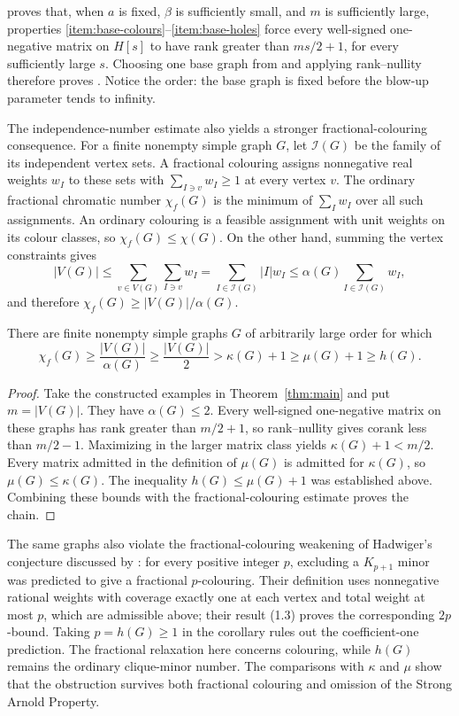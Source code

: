  proves that, when \(a\) is fixed,
\(\beta\) is sufficiently small, and \(m\) is sufficiently large,
properties \ref{item:base-colours}--\ref{item:base-holes} force every
well-signed one-negative matrix on \(H[s]\) to have rank greater than
\(ms/2+1\), for every sufficiently large \(s\).
Choosing one base graph from  and applying
rank--nullity therefore proves . Notice the order:
the base graph is fixed before the blow-up parameter tends to
infinity.

The independence-number estimate also yields a stronger
fractional-colouring consequence. For a finite nonempty simple graph
\(G\), let \(\mathcal I(G)\) be the family of its independent vertex
sets. A fractional colouring assigns nonnegative real weights \(w_I\)
to these sets with \(\sum_{I\ni v}w_I\ge1\) at every vertex \(v\).
The ordinary fractional chromatic number \(\chi_f(G)\) is the minimum
of \(\sum_Iw_I\) over all such assignments. An ordinary colouring is
a feasible assignment with unit weights on its colour classes, so
\(\chi_f(G)\le\chi(G)\). On the other hand, summing the vertex
constraints gives
\[
 |V(G)|\le \sum_{v\in V(G)}\sum_{I\ni v}w_I
 =\sum_{I\in\mathcal I(G)}|I|w_I
 \le \alpha(G)\sum_{I\in\mathcal I(G)}w_I,
\]
and therefore \(\chi_f(G)\ge |V(G)|/\alpha(G)\).

\begin{corollary}\label{cor:fractional-spectral}
There are finite nonempty simple graphs \(G\) of arbitrarily large
order for which
\[
 \chi_f(G)\ge \frac{|V(G)|}{\alpha(G)}
 \ge \frac{|V(G)|}{2}
 >\kappa(G)+1\ge\mu(G)+1\ge h(G).
\]
\end{corollary}
\begin{proof}
Take the constructed examples in Theorem~\ref{thm:main} and put
\(m=|V(G)|\). They have \(\alpha(G)\le2\). Every well-signed
one-negative matrix on these graphs has rank greater than \(m/2+1\),
so rank--nullity gives corank less than \(m/2-1\). Maximizing in the
larger matrix class yields \(\kappa(G)+1<m/2\).
Every matrix admitted in the definition of
\(\mu(G)\) is admitted for \(\kappa(G)\), so \(\mu(G)\le\kappa(G)\).
The inequality \(h(G)\le\mu(G)+1\) was established above. Combining
these bounds with the fractional-colouring estimate proves the chain.
\end{proof}

The same graphs also violate the fractional-colouring weakening
of Hadwiger's conjecture discussed by
\citet[p.~148]{reedseymour1998}: for every positive integer \(p\),
excluding a \(K_{p+1}\) minor was predicted to give a fractional
\(p\)-colouring. Their definition uses nonnegative rational weights
with coverage exactly one at each vertex and total weight at most
\(p\), which are admissible above; their result (1.3) proves the
corresponding \(2p\)-bound.
Taking \(p=h(G)\ge1\) in the corollary rules out the coefficient-one
prediction. The fractional relaxation here concerns colouring,
while \(h(G)\) remains the ordinary clique-minor number. The
comparisons with \(\kappa\) and \(\mu\) show that the obstruction
survives both fractional colouring and omission of the Strong Arnold
Property.

